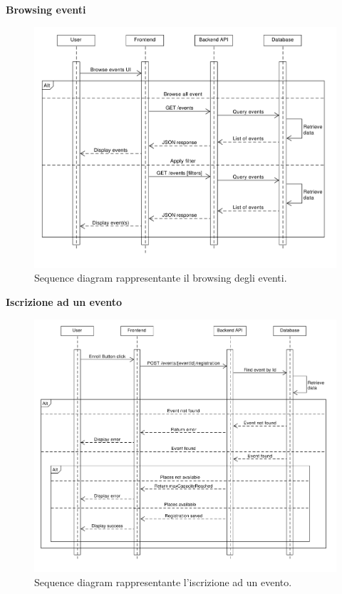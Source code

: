 \documentclass[9pt]{extarticle}
\begin{document}
\newpage
\textbf{Browsing eventi}
\begin{figure}[!htb]
	\centering
	\includegraphics[width=\linewidth]{./images/SequenceDiagramBrowseEvents.pdf}
	\caption{Sequence diagram rappresentante il browsing degli eventi.}
	\label{fig:SeqDiagBrowseEvents}
\end{figure}

\newpage
\textbf{Iscrizione ad un evento}
\begin{figure}[!htb]
	\centering
	\includegraphics[width=\linewidth]{./images/SequenceDiagramEventEnrolling.pdf}
	\caption{Sequence diagram rappresentante l'iscrizione ad un evento.}
	\label{fig:SeqDiagEventEnroll}
\end{figure}
\end{document}
